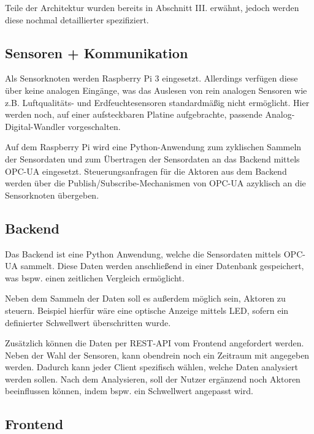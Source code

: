 \documentclass[letterpaper, 10 pt, conference]{ieeeconf}  %
\begin{document}
Teile der Architektur wurden bereits in Abschnitt III. erwähnt, jedoch werden diese nochmal detaillierter spezifiziert.

\subsection{Sensoren + Kommunikation}
Als Sensorknoten werden Raspberry Pi 3 eingesetzt. Allerdings verfügen diese über keine analogen Eingänge, was das Auslesen von rein analogen Sensoren wie z.B. Luftqualitäts- und Erdfeuchtesensoren standardmäßig nicht ermöglicht. Hier werden noch, auf einer aufsteckbaren Platine aufgebrachte, passende Analog-Digital-Wandler vorgeschalten.

Auf dem Raspberry Pi wird eine Python-Anwendung zum zyklischen Sammeln der Sensordaten und zum Übertragen der Sensordaten an das Backend mittels OPC-UA eingesetzt. Steuerungsanfragen für die Aktoren aus dem Backend werden über die Publish/Subscribe-Mechanismen von OPC-UA azyklisch an die Sensorknoten übergeben.

\subsection{Backend}

Das Backend ist eine Python Anwendung, welche die Sensordaten mittels OPC-UA sammelt.
Diese Daten werden anschließend in einer Datenbank gespeichert, was bspw. einen zeitlichen Vergleich ermöglicht.

Neben dem Sammeln der Daten soll es außerdem möglich sein, Aktoren zu steuern. 
Beispiel hierfür wäre eine optische Anzeige mittels LED, sofern ein definierter Schwellwert überschritten wurde.

Zusätzlich können die Daten per REST-API vom Frontend angefordert werden. 
Neben der Wahl der Sensoren, kann obendrein noch ein Zeitraum mit angegeben werden. 
Dadurch kann jeder Client spezifisch wählen, welche Daten analysiert werden sollen.
Nach dem Analysieren, soll der Nutzer ergänzend noch Aktoren beeinflussen können, indem bspw. ein Schwellwert angepasst wird. 

\subsection{Frontend}
\end{document}
